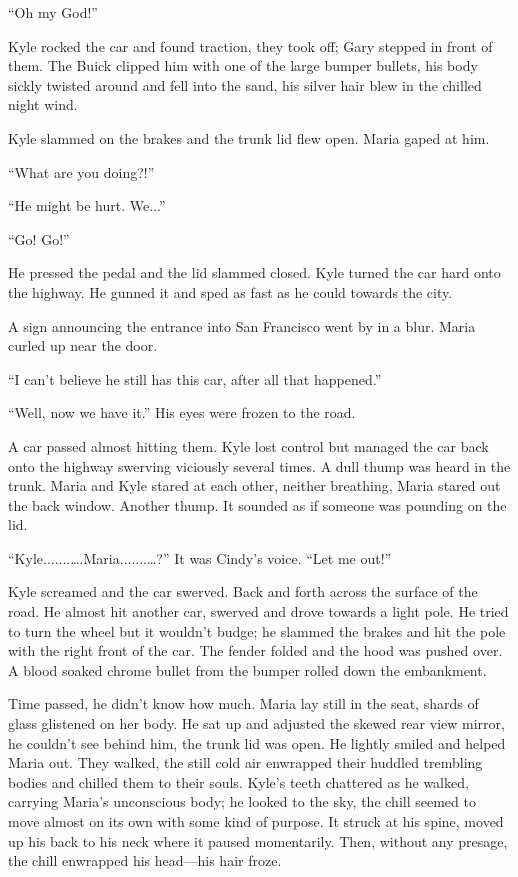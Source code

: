 ``Oh my God!''

Kyle rocked the car and found traction, they took off; Gary stepped in
front of them. The Buick clipped him with one of the large bumper
bullets, his body sickly twisted around and fell into the sand, his
silver hair blew in the chilled night wind.

Kyle slammed on the brakes and the trunk lid flew open. Maria gaped at
him.

``What are you doing?!''

``He might be hurt. We...''

``Go! Go!''

He pressed the pedal and the lid slammed closed. Kyle turned the car
hard onto the highway. He gunned it and sped as fast as he could towards
the city.

A sign announcing the entrance into San Francisco went by in a blur.
Maria curled up near the door.

``I can't believe he still has this car, after all that happened.''

``Well, now we have it.'' His eyes were frozen to the road.

A car passed almost hitting them. Kyle lost control but managed the car
back onto the highway swerving viciously several times. A dull thump was
heard in the trunk. Maria and Kyle stared at each other, neither
breathing, Maria stared out the back window. Another thump. It sounded
as if someone was pounding on the lid.

``Kyle.......\ldots.Maria.......\ldots?'' It was Cindy's voice. ``Let me
out!''

Kyle screamed and the car swerved. Back and forth across the surface of
the road. He almost hit another car, swerved and drove towards a light
pole. He tried to turn the wheel but it wouldn't budge; he slammed the
brakes and hit the pole with the right front of the car. The fender
folded and the hood was pushed over. A blood soaked chrome bullet from
the bumper rolled down the embankment.

Time passed, he didn't know how much. Maria lay still in the seat,
shards of glass glistened on her body. He sat up and adjusted the skewed
rear view mirror, he couldn't see behind him, the trunk lid was open. He
lightly smiled and helped Maria out. They walked, the still cold air
enwrapped their huddled trembling bodies and chilled them to their
souls. Kyle's teeth chattered as he walked, carrying Maria's unconscious
body; he looked to the sky, the chill seemed to move almost on its own
with some kind of purpose. It struck at his spine, moved up his back to
his neck where it paused momentarily. Then, without any presage, the
chill enwrapped his head---his hair froze.

